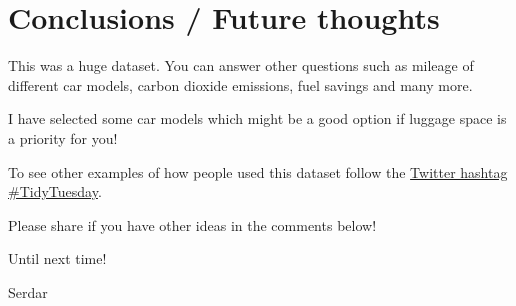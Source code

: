 \documentclass[]{article}
\begin{document}
\hypertarget{conclusions-future-thoughts}{%
\section{Conclusions / Future
thoughts}\label{conclusions-future-thoughts}}

This was a huge dataset. You can answer other questions such as mileage
of different car models, carbon dioxide emissions, fuel savings and many
more.

I have selected some car models which might be a good option if luggage
space is a priority for you!

To see other examples of how people used this dataset follow the
\href{https://twitter.com/hashtag/tidytuesday?lang=en}{Twitter hashtag
\#TidyTuesday}.

Please share if you have other ideas in the comments below!

Until next time!

Serdar
\end{document}
